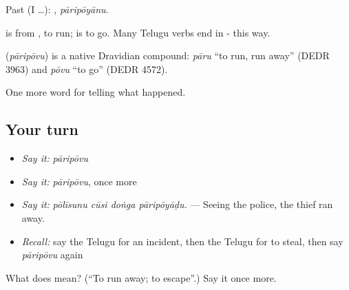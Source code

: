 Past (I …): , \emph{pāripōyānu}.

 is from , to run;  is to go. Many Telugu verbs end in - this way.

\begin{cousinweb}
\textbf{} (\emph{pāripōvu}) is a native Dravidian compound: \emph{pāru} \textquotedblleft{}to run, run away\textquotedblright{} (DEDR 3963) and \emph{pōvu} \textquotedblleft{}to go\textquotedblright{} (DEDR 4572).
\end{cousinweb}

\begin{grammarlens}[title={What you've built}]
One more word for telling what happened.
\end{grammarlens}

\subsection*{Your turn}
\begin{itemize}
\raggedright
  \item \emph{Say it:} \emph{pāripōvu}
  \item \emph{Say it:} \emph{pāripōvu}, once more
  \item \emph{Say it:} \emph{pōlīsunu cūsi doṅga pāripōyāḍu.} — Seeing the police, the thief ran away.
  \item \emph{Recall:} say the Telugu for an incident, then the Telugu for to steal, then say \emph{pāripōvu} again
\end{itemize}

\begin{tcolorbox}[breakable,colback=teal!4,colframe=teal!35!black,title={Before you move on}]
What does  mean? (\textquotedblleft{}To run away; to escape\textquotedblright{}.) Say it once more.
\end{tcolorbox}
